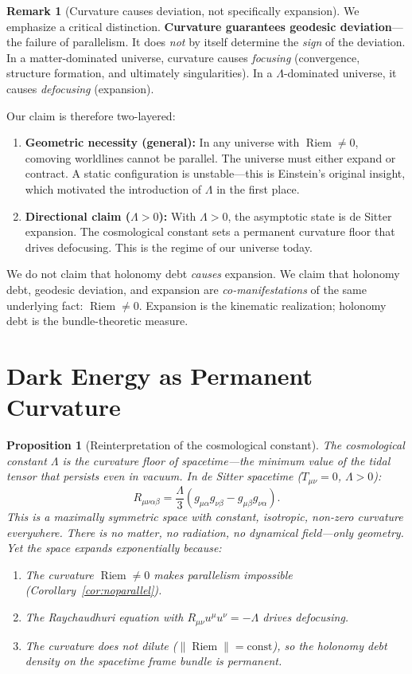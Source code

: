 \documentclass[12pt]{amsart}
\newtheorem{proposition}[theorem]{Proposition}
\theoremstyle{definition}
\newtheorem{remark}[theorem]{Remark}
\newcommand{\Riem}{\operatorname{Riem}}
\begin{document}
\begin{remark}[Curvature causes deviation, not specifically expansion]
We emphasize a critical distinction.  \textbf{Curvature guarantees geodesic deviation}---the failure of parallelism.  It does \emph{not} by itself determine the \emph{sign} of the deviation.  In a matter-dominated universe, curvature causes \emph{focusing} (convergence, structure formation, and ultimately singularities).  In a $\Lambda$-dominated universe, it causes \emph{defocusing} (expansion).

Our claim is therefore two-layered:
\begin{enumerate}[label=\textup{(\arabic*)}]
\item \textbf{Geometric necessity (general):} In any universe with $\Riem \neq 0$, comoving worldlines cannot be parallel.  The universe must either expand or contract.  A static configuration is unstable---this is Einstein's original insight, which motivated the introduction of $\Lambda$ in the first place.
\item \textbf{Directional claim ($\Lambda > 0$):} With $\Lambda > 0$, the asymptotic state is de Sitter expansion.  The cosmological constant sets a permanent curvature floor that drives defocusing.  This is the regime of our universe today.
\end{enumerate}
We do not claim that holonomy debt \emph{causes} expansion.  We claim that holonomy debt, geodesic deviation, and expansion are \emph{co-manifestations} of the same underlying fact: $\Riem \neq 0$.  Expansion is the kinematic realization; holonomy debt is the bundle-theoretic measure.
\end{remark}


\section{Dark Energy as Permanent Curvature}

\begin{proposition}[Reinterpretation of the cosmological constant]
\label{prop:darkenergy}
The cosmological constant $\Lambda$ is the curvature floor of spacetime---the minimum value of the tidal tensor that persists even in vacuum.  In de Sitter spacetime ($T_{\mu\nu} = 0$, $\Lambda > 0$):
\[
R_{\mu\nu\alpha\beta} = \frac{\Lambda}{3}(g_{\mu\alpha}g_{\nu\beta} - g_{\mu\beta}g_{\nu\alpha}).
\]
This is a maximally symmetric space with constant, isotropic, non-zero curvature everywhere.  There is no matter, no radiation, no dynamical field---only geometry.  Yet the space expands exponentially because:
\begin{enumerate}[label=\textup{(\alph*)}]
\item The curvature $\Riem \neq 0$ makes parallelism impossible (Corollary~\ref{cor:noparallel}).
\item The Raychaudhuri equation with $R_{\mu\nu}u^\mu u^\nu = -\Lambda$ drives defocusing.
\item The curvature does not dilute ($\|\Riem\| = \text{const}$), so the holonomy debt density on the spacetime frame bundle is permanent.
\end{enumerate}
\end{proposition}
\end{document}
